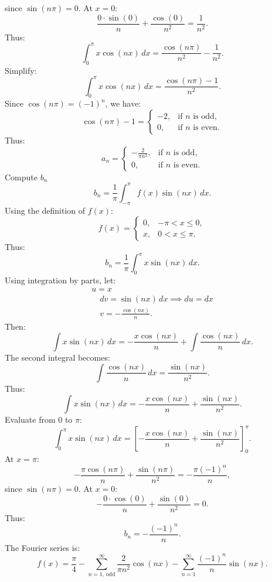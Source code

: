 \documentclass[12pt]{article}
\begin{document}
        since \(\sin(n\pi) = 0\).
        At \(x = 0\):
        \[
        \frac{0 \cdot \sin(0)}{n} + \frac{\cos(0)}{n^2} = \frac{1}{n^2}.
        \]
        Thus:
        \[
        \int_0^\pi x \cos(nx) \, dx = \frac{\cos(n\pi)}{n^2} - \frac{1}{n^2}.
        \]
        Simplify:
        \[
        \int_0^\pi x \cos(nx) \, dx = \frac{\cos(n\pi) - 1}{n^2}.
        \]
        Since \(\cos(n\pi) = (-1)^n\), we have:
        \[
        \cos(n\pi) - 1 = 
        \begin{cases} 
        -2, & \text{if } n \text{ is odd}, \\
        0, & \text{if } n \text{ is even}.
        \end{cases}
        \]
        Thus:
        \[
        a_n = 
        \begin{cases} 
        -\frac{2}{\pi n^2}, & \text{if } n \text{ is odd}, \\
        0, & \text{if } n \text{ is even}.
        \end{cases}
        \]
        Compute \(b_n\)
        \[
        b_n = \frac{1}{\pi} \int_{-\pi}^\pi f(x) \sin(nx) \, dx.
        \]
        Using the definition of \(f(x)\):
        \[
        f(x) = 
        \begin{cases} 
        0, & -\pi < x \leq 0, \\
        x, & 0 < x \leq \pi.
        \end{cases}
        \]
        Thus:
        \[
        b_n = \frac{1}{\pi} \int_0^\pi x \sin(nx) \, dx.
        \]
        Using integration by parts, let:
        \[
        \begin{split}
            u = x
            \\ \quad dv = \sin(nx) \, dx \implies du = dx
            \\ \quad v = -\frac{\cos(nx)}{n}.    
        \end{split}
        \]
        Then:
        \[
        \int x \sin(nx) \, dx = -\frac{x \cos(nx)}{n} + \int \frac{\cos(nx)}{n} \, dx.
        \]
        The second integral becomes:
        \[
        \int \frac{\cos(nx)}{n} \, dx = \frac{\sin(nx)}{n^2}.
        \]
        Thus:
        \[
        \int x \sin(nx) \, dx = -\frac{x \cos(nx)}{n} + \frac{\sin(nx)}{n^2}.
        \]
        Evaluate from \(0\) to \(\pi\):
        \[
        \int_0^\pi x \sin(nx) \, dx = \left[-\frac{x \cos(nx)}{n} + \frac{\sin(nx)}{n^2}\right]_0^\pi.
        \]
        At \(x = \pi\):
        \[
        -\frac{\pi \cos(n\pi)}{n} + \frac{\sin(n\pi)}{n^2} = -\frac{\pi (-1)^n}{n},
        \]
        since \(\sin(n\pi) = 0\).
        At \(x = 0\):
        \[
        -\frac{0 \cdot \cos(0)}{n} + \frac{\sin(0)}{n^2} = 0.
        \]
        Thus:
        \[
        b_n = -\frac{(-1)^n}{n}.
        \]
        The Fourier series is:
        \[
        \boxed{f(x) = \frac{\pi}{4} - \sum_{n=1,\, \text{odd}}^\infty \frac{2}{\pi n^2} \cos(nx) - \sum_{n=1}^\infty \frac{(-1)^n}{n} \sin(nx).}
        \]
\end{document}
